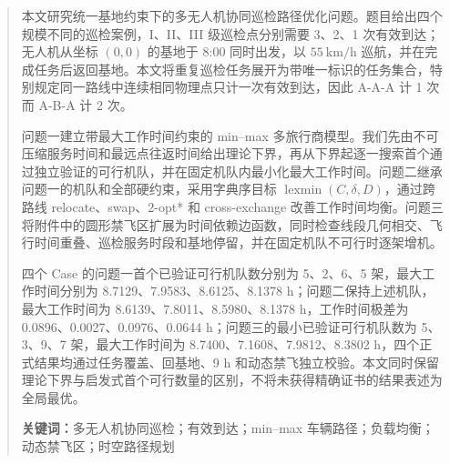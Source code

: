 \begin{abstract}
本文研究统一基地约束下的多无人机协同巡检路径优化问题。题目给出四个规模不同的巡检案例，I、II、III 级巡检点分别需要 3、2、1 次有效到达；无人机从坐标 $(0,0)$ 的基地于 8:00 同时出发，以 $55\ \mathrm{km/h}$ 巡航，并在完成任务后返回基地。本文将重复巡检任务展开为带唯一标识的任务集合，特别规定同一路线中连续相同物理点只计一次有效到达，因此 A-A-A 计 1 次而 A-B-A 计 2 次。

问题一建立带最大工作时间约束的 min--max 多旅行商模型。我们先由不可压缩服务时间和最远点往返时间给出理论下界，再从下界起逐一搜索首个通过独立验证的可行机队，并在固定机队内最小化最大工作时间。问题二继承问题一的机队和全部硬约束，采用字典序目标 $\operatorname{lexmin}(C,\delta,D)$，通过跨路线 relocate、swap、2-opt* 和 cross-exchange 改善工作时间均衡。问题三将附件中的圆形禁飞区扩展为时间依赖边函数，同时检查线段几何相交、飞行时间重叠、巡检服务时段和基地停留，并在固定机队不可行时逐架增机。

四个 Case 的问题一首个已验证可行机队数分别为 5、2、6、5 架，最大工作时间分别为 8.7129、7.9583、8.6125、8.1378 h；问题二保持上述机队，最大工作时间为 8.6139、7.8011、8.5980、8.1378 h，工作时间极差为 0.0896、0.0027、0.0976、0.0644 h；问题三的最小已验证可行机队数为 5、3、9、7 架，最大工作时间为 8.7400、7.1608、7.9812、8.3802 h，四个正式结果均通过任务覆盖、回基地、9 h 和动态禁飞独立校验。本文同时保留理论下界与启发式首个可行数量的区别，不将未获得精确证书的结果表述为全局最优。

\noindent\textbf{关键词：}多无人机协同巡检；有效到达；min--max 车辆路径；负载均衡；动态禁飞区；时空路径规划
\end{abstract}

